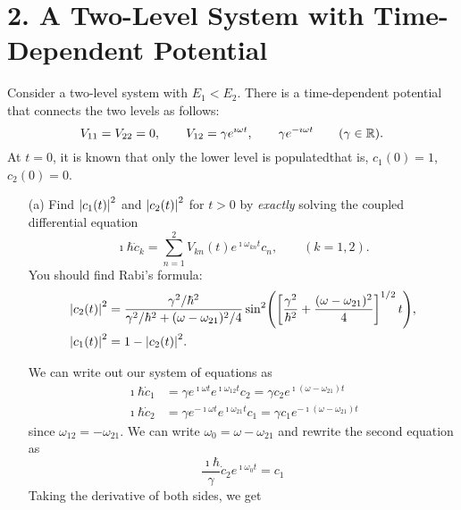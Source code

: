 \documentclass[a4paper,twoside]{article}
\begin{document}
\section*{2. A Two-Level System with Time-Dependent Potential}
Consider a two-level system with $ E_1 < E_2 $. There is a time-dependent potential that connects the two levels as follows:
\begin{equation}
    V_{11} = V_{22} = 0,\qquad V_{12} = \gamma e^{\imath \omega t},\qquad \gamma e^{- \imath \omega t} \qquad (\gamma \in \mathbb{R}).
\end{equation}
At $ t = 0 $, it is known that only the lower level is populated\textemdash that is, $ c_1(0) = 1 $, $ c_2(0) = 0 $.
\begin{itemize}
    \item[(a)] Find $ \abs{c_1(t)}^2 $ and $ \abs{c_2(t)}^2 $ for $ t > 0 $ by \textit{exactly} solving the coupled differential equation
        \begin{equation}
            \imath \hbar \dot{c}_k = \sum_{n=1}^{2} V_{kn}(t) e^{\imath \omega_{kn} t} c_n,\qquad (k = 1,2).
        \end{equation}
        You should find Rabi's formula:
        \begin{align}
            \abs{c_2(t)}^2 &= \frac{\gamma^2 / \hbar^2}{\gamma^2 / \hbar^2 + (\omega - \omega_{21})^2 / 4} \sin[2](\left[ \frac{\gamma^2}{\hbar^2} + \frac{(\omega - \omega_{21})^2}{4} \right]^{1/2} t),\\
            \abs{c_1(t)}^2 &= 1 - \abs{c_2(t)}^2.
        \end{align}
        \begin{problem}
            We can write out our system of equations as
           \begin{align}
               \imath \hbar \dot{c}_1 &= \gamma e^{\imath \omega t} e^{\imath \omega_{12} t} c_2 = \gamma c_2 e^{\imath (\omega - \omega_{21}) t} \\
               \imath \hbar \dot{c}_2 &= \gamma e^{- \imath \omega t} e^{\imath \omega_{21} t} c_1 = \gamma c_1 e^{-\imath (\omega - \omega_{21}) t}
           \end{align}
           since $ \omega_{12} = - \omega_{21} $. We can write $ \omega_0 = \omega - \omega_{21} $ and rewrite the second equation as
           \begin{equation}
               \frac{\imath \hbar}{\gamma} \dot{c}_2 e^{\imath \omega_0 t} = c_1
           \end{equation}
           Taking the derivative of both sides, we get

\end{problem}
\end{itemize}
\end{document}
